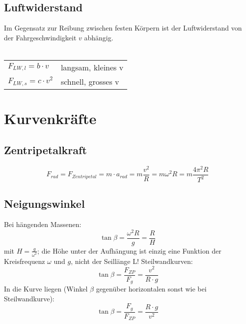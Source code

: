 \subsection{Luftwiderstand}
Im Gegensatz zur Reibung zwischen festen K\"orpern ist der Luftwiderstand von der Fahrgeschwindigkeit $v$ abh\"angig.\\
\\
\begin{footnotesize}
	\begin{tabular}{|l|l}		
			\cline{0-0}
			$F_{LW,l}=b\cdot v$		& langsam, kleines v\\
			$F_{LW,s}=c\cdot v^2$	&	schnell, grosses v\\
			\cline{0-0}
	\end{tabular}
\end{footnotesize}

\section{Kurvenkr\"afte}
\subsection{Zentripetalkraft}
\[
	\boxed{F_{rad}=F_{Zentripetal}=m\cdot a_{rad}=m\frac{v^2}{R}=m\omega^2R=m\frac{4\pi^2R}{T^2}}
\]
\subsection{Neigungswinkel}
Bei h\"angenden Massenen:
\[
	\boxed{\tan\beta=\frac{\omega^2R}{g}=\frac{R}{H}}
\]
mit $H=\frac{g}{\omega^2}$; die H\"ohe unter der Aufh\"angung ist einzig eine Funktion der Kreisfrequenz $\omega$ und $g$, nicht der Seill\"ange L!
\newline
\newline
Steilwandkurven:
\[
	\boxed{\tan\beta=\frac{F_{ZP}}{F_g}=\frac{v^2}{R\cdot g}}
\]
\newline
\newline
In die Kurve liegen (Winkel $\beta$ gegen\"uber horizontalen sonst wie bei Steilwandkurve):
\[
	\boxed{\tan\beta=\frac{F_g}{F_{ZP}}=\frac{R\cdot g}{v^2}}
\]
